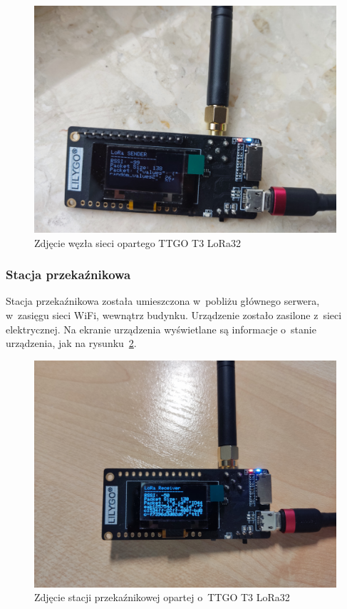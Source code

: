 \begin{figure}[b!]
    \begin{center}
        \includegraphics[width=13cm]{pic/wezel2.jpg}
    \end{center}
    \caption{Zdjęcie węzła sieci opartego TTGO T3 LoRa32}\label{rys:wezel2}
\end{figure}

\subsubsection{Stacja przekaźnikowa}
Stacja przekaźnikowa została umieszczona w~pobliżu głównego serwera, w~zasięgu sieci WiFi, wewnątrz budynku.
Urządzenie zostało zasilone z~sieci elektrycznej.
Na ekranie urządzenia wyświetlane są informacje o~stanie urządzenia, jak na rysunku~\ref{rys:stacja1}.

\begin{figure}[b!]
    \begin{center}
        \includegraphics[width=13cm]{pic/stacja1.jpg}
    \end{center}
    \caption{Zdjęcie stacji przekaźnikowej opartej o~TTGO T3 LoRa32}\label{rys:stacja1}
\end{figure}


